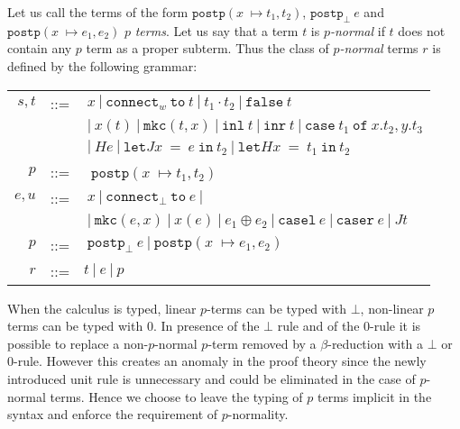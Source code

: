 \begin{remark}
Let us call the terms of the form $\mathtt{postp} (x 􏰀\mapsto t_1, t_2)$, $\mathtt{postp}_{\bot}\ e$ and 
$\mathtt{postp} (x 􏰀\mapsto e_1, e_2)$ $p$ \emph{terms}. Let us say that a term $t$ is \emph{$p$-normal}  if $t$ does not 
contain any $p$ term as a proper subterm. Thus the class of \emph{$p$-normal} terms $r$ is defined by the following 
grammar:
\begin{center}
\begin{tabular}{rcl}
$s, t$ & \quad ::=\quad &$\ x\ |\  \mathtt{connect}_w\ \mathtt{to}\  t\ |\  t_1\cdot t_2\ |\  \mathtt{false}\  t\ $\\
&& $\ |\ x(t)\ |\ \mathtt{mkc}(t, x)\ |\   \mathtt{inl}\ t\ |\ \mathtt{inr}\ t \ |\  \mathtt{case}\ t_1\ \mathtt{of}\ x.t_2 , y.t_3$\\
&& $\ |\ He\ |\  \mathtt{let}J x\ =\ e\ \mathtt{in}\ t_2\ |\ \mathtt{let} H x\ =\ t_1\ \mathtt{in}\ t_2$\\
$p$ &\quad ::= \quad &\ $\mathtt{postp} (x 􏰀\mapsto t_1, t_2)$\\
$e, u$ &\quad::=\quad & $ \ x\ |\  \mathtt{connect}_{\bot}\ \mathtt{to}\ e\ |$ \\
&& $\ |\  \mathtt{mkc}(e, x)\ |\  x(e)\ |\  e_1\oplus e_2\ |\ \mathtt{casel}\ e\ |\  \mathtt{caser}\ e\ |\ Jt$ \\
$p$ &\quad ::=\quad & $\ \mathtt{postp}_{\bot}\ e\ |\ \mathtt{postp} (x 􏰀\mapsto e_1, e_2)$\\
$r$ &\quad ::= \quad & $ t \ |\ e\ |\ p $
\end{tabular}
\end{center}
\end{remark}
When the calculus is typed, linear $p$-terms can be typed with $\bot$, non-linear $p$ terms can be typed with $0$.
In presence of the $\bot$ rule and of the 0-rule it is possible to replace a non-$p$-normal $p$-term removed by a
$\beta$-reduction with a $\bot$ or 0-rule. However this creates an anomaly in the proof theory since the newly 
introduced unit rule is unnecessary and could be eliminated in the case of $p$-normal terms. Hence we choose 
to leave the typing of $p$ terms implicit in the syntax and enforce the requirement of $p$-normality.

\vspace{1ex}

